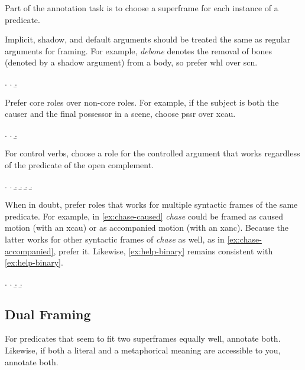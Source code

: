 \documentclass[a4paper]{article}
\begin{document}
Part of the annotation task is to choose a superframe for each instance of a predicate.

Implicit, shadow, and default arguments \citep{di-fabio-etal-2019-verbatlas} should
be treated the same as regular arguments for framing. For example,
\emph{debone} denotes the removal of bones (denoted by a shadow argument) from
a body, so prefer \textsf{whl} over \textsf{scn}.

\ex. \a. 
     \b. 


Prefer core roles over non-core roles. For example, if the subject is both the causer and the final possessor in a scene, choose \textsf{pssr} over \textsf{xcau}.

\ex. \a. 
     \b. 

For control verbs, choose a role for the controlled argument that works
regardless of the predicate of the open complement.

\ex.
\a. 
\b. 
\b. 
\b. 
\b. \label{ex:help-ternary} 

When in doubt, prefer roles that works for multiple syntactic frames of the
same predicate. For example, in \ref{ex:chase-caused} \emph{chase} could be
framed as caused motion (with an \textsf{xcau}) or as accompanied motion (with
an \textsf{xanc}). Because the latter works for other syntactic frames of
\emph{chase} as well, as in \ref{ex:chase-accompanied}, prefer it. Likewise,
\ref{ex:help-binary} remains consistent with \ref{ex:help-binary}.

\ex.
\a. \label{ex:chase-caused} 
\b. \label{ex:chase-accompanied} 
\b. \label{ex:help-binary} 

\subsection{Dual Framing}

For predicates that seem to fit two superframes equally well, annotate both. Likewise, if both a literal and a metaphorical meaning are accessible to you, annotate both.
\end{document}
